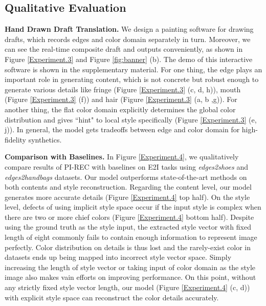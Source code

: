 \documentclass[10pt,twocolumn,letterpaper]{article} \usepackage{amsfonts,amssymb}
\begin{document}
\subsection{Qualitative Evaluation} \label{Qualitative Evaluation}
{\bf Hand Drawn Draft Translation.}
We design a painting software for drawing drafts, which records edges and color domain separately in turn. Moreover, we can see the real-time composite draft and outputs conveniently, as shown in  Figure \ref{Experiment.3} and Figure \ref{fig:banner} (b). The demo of this interactive software is shown in the supplementary material. For one thing, the edge plays an important role in generating content, which is not concrete but robust enough to generate various details like fringe (Figure \ref{Experiment.3} (c, d, h)), mouth (Figure \ref{Experiment.3} (f)) and hair (Figure \ref{Experiment.3} (a, b ,g)). For another thing, the flat color domain explicitly determines the global color distribution and gives ``hint" to local style specifically (Figure \ref{Experiment.3} (e, j)). In general, the model gets tradeoffs between edge and color domain for high-fidelity synthetics.




{\bf Comparison with Baselines.}
In Figure \ref{Experiment.4}, we qua\-li\-ta\-tively compare results of PI-REC with baselines on E2I tasks using \emph{edges2shoes} and \emph{edges2handbags} datasets. Our model outperforms state-of-the-art methods on both contents and style reconstruction. Regarding the content level, our model generates more accurate details (Figure \ref{Experiment.4} top half). On the style level, defects of using implicit style space occur if the input style is complex when there are two or more chief colors (Figure \ref{Experiment.4} bottom half). Despite using the ground truth as the style input, the extracted style vector with fixed length of eight commonly fails to contain enough information to represent image perfectly. Color distribution on details is thus lost and the rarely-exist color in datasets ends up being mapped into incorrect style vector space. Simply increasing the length of style vector or taking input of color domain as the style image also makes vain efforts on improving performance. On this point, without any strictly fixed style vector length, our model (Figure \ref{Experiment.4} (c, d)) with explicit style space can reconstruct the color details accurately.
\end{document}
